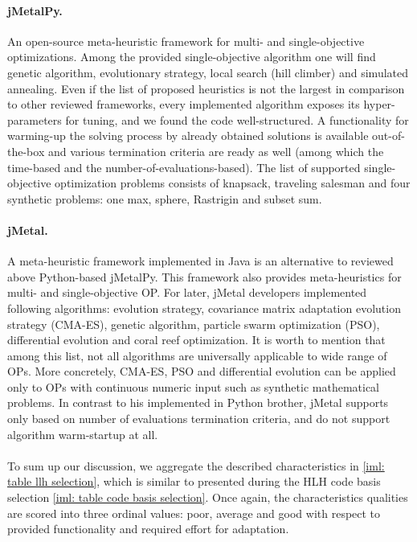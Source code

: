 \paragraph{jMetalPy.} An open-source meta-heuristic framework for multi- and single-objective optimizations. Among the provided single-objective algorithm one will find genetic algorithm, evolutionary strategy, local search (hill climber) and simulated annealing. Even if the list of proposed heuristics is not the largest in comparison to other reviewed frameworks, every implemented algorithm exposes its hyper-parameters for tuning, and we found the code well-structured. A functionality for warming-up the solving process by already obtained solutions is available out-of-the-box and various termination criteria are ready as well (among which the time-based and the number-of-evaluations-based). The list of supported single-objective optimization problems consists of knapsack, traveling salesman and four synthetic problems: one max, sphere, Rastrigin and subset sum.

\paragraph{jMetal.} A meta-heuristic framework implemented in Java is an alternative to reviewed above Python-based jMetalPy. This framework also provides meta-heuristics for multi- and single-objective OP. For later, jMetal developers implemented following algorithms: evolution strategy, covariance matrix adaptation evolution strategy (CMA-ES), genetic algorithm, particle swarm optimization (PSO), differential evolution and coral reef optimization. It is worth to mention that among this list, not all algorithms are universally applicable to wide range of OPs. More concretely, CMA-ES, PSO and differential evolution can be applied only to OPs with continuous numeric input such as synthetic mathematical problems. In contrast to his implemented in Python brother, jMetal supports only based on number of evaluations termination criteria, and do not support algorithm warm-startup at all.

\paragraph{} To sum up our discussion, we aggregate the described characteristics in \cref{iml: table llh selection}, which is similar to presented during the HLH code basis selection \cref{iml: table code basis selection}. Once again, the characteristics qualities are scored into three ordinal values: poor, average and good with respect to provided functionality and required effort for adaptation.


